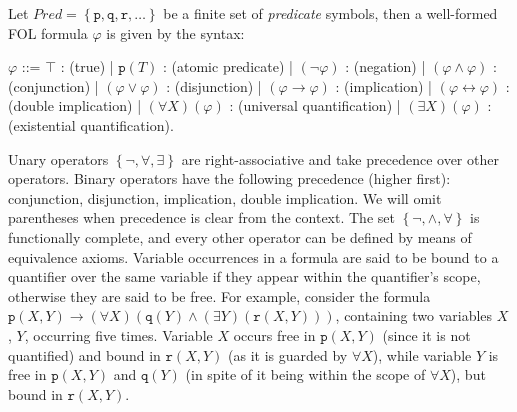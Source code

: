 Let $\textit{Pred} = \left\{\texttt{p}, \texttt{q}, \texttt{r}, \dots\right\}$ be a finite set of \textit{predicate} symbols, then a well-formed FOL formula $\varphi$ is given by the syntax:
\begin{center}
	\begin{bnf}
		$\varphi$ ::= $\top$ : (true)
		| $\texttt{p}(T)$ : (atomic predicate)
		| $(\neg \varphi)$ : (negation)
		| $(\varphi \wedge \varphi)$ : (conjunction)
		| $(\varphi \vee \varphi)$ : (disjunction)
		| $(\varphi \rightarrow \varphi)$ : (implication)
		| $(\varphi \leftrightarrow \varphi)$ : (double implication)
		| $(\forall X)(\varphi)$ : (universal quantification)
		| $(\exists X)(\varphi)$ : (existential quantification).
	\end{bnf}
\end{center}
Unary operators $\left\{\neg, \forall, \exists\right\}$ are right-associative and take precedence over other operators. Binary operators have the following precedence (higher first): conjunction, disjunction, implication, double implication. We will omit parentheses when precedence is clear from the context. The set $\left\{\neg, \wedge, \forall\right\}$ is functionally complete, and every other operator can be defined by means of equivalence axioms.
Variable occurrences in a formula are said to be bound to a quantifier over the same variable if they appear within the quantifier's scope, otherwise they are said to be free.
For example, consider the formula $\texttt{p}(X, Y) \rightarrow (\forall X)(\texttt{q}(Y) \wedge (\exists Y)(\texttt{r}(X,Y)))$, containing two variables $X$, $Y$, occurring five times. Variable $X$ occurs free in $\texttt{p}(X, Y)$ (since it is not quantified) and bound in $\texttt{r}(X, Y)$ (as it is guarded by $\forall X$), while variable $Y$ is free in $\texttt{p}(X, Y)$ and $\texttt{q}(Y)$ (in spite of it being within the scope of $\forall X$), but bound in $\texttt{r}(X, Y)$.

